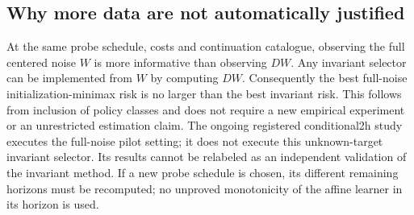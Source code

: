 \subsection{Why more data are not automatically justified}
At the same probe schedule, costs and continuation catalogue, observing the full centered noise $W$ is more informative than observing $DW$.
Any invariant selector can be implemented from $W$ by computing $DW$.
Consequently the best full-noise initialization-minimax risk is no larger than the best invariant risk.
This follows from inclusion of policy classes and does not require a new empirical experiment or an unrestricted estimation claim.
The ongoing registered conditional2h study executes the full-noise pilot setting; it does not execute this unknown-target invariant selector.
Its results cannot be relabeled as an independent validation of the invariant method.
If a new probe schedule is chosen, its different remaining horizons must be recomputed; no unproved monotonicity of the affine learner in its horizon is used.
